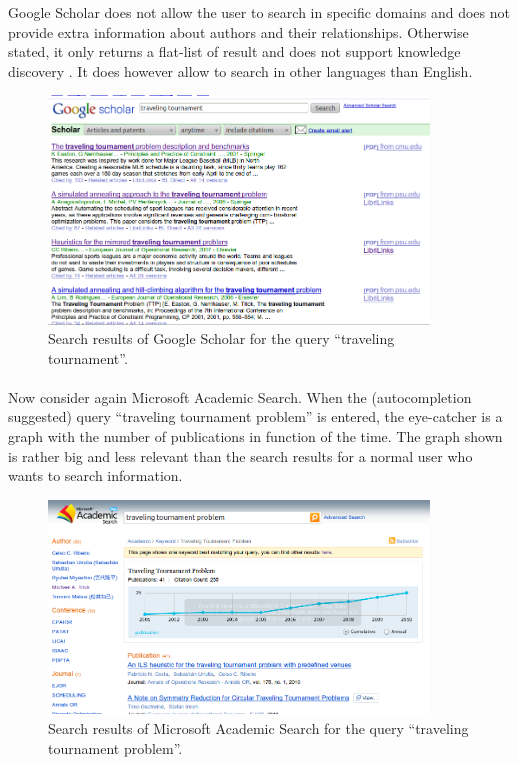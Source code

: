 \documentclass[a4paper,english,10pt]{scrartcl}
\begin{document}
Google Scholar does not allow the user to search in specific domains and does not provide extra information about authors and their relationships. Otherwise stated, it only returns a flat-list of result and does not support knowledge discovery \cite{wang}. It does however allow to search in other languages than English.
\begin{figure}[hbpt]
 \centering
 \includegraphics[width=0.9\textwidth]{ttpscholar}
 \caption{Search results of Google Scholar for the query ``traveling tournament''.}
 \label{ttpscholar}
\end{figure}

\paragraph{}

Now consider again Microsoft Academic Search. When the (autocompletion suggested) query ``traveling tournament problem'' is entered, the eye-catcher is a graph with the number of publications in function of the time. The graph shown is rather big and less relevant than the search results for a normal user who wants to search information.
\begin{figure}[Hhbpt]
 \centering
 \includegraphics[width=0.9\textwidth]{ttproblem}
 \caption{Search results of Microsoft Academic Search for the query ``traveling tournament problem''.}
 \label{ttpproblem}
\end{figure}
\end{document}
